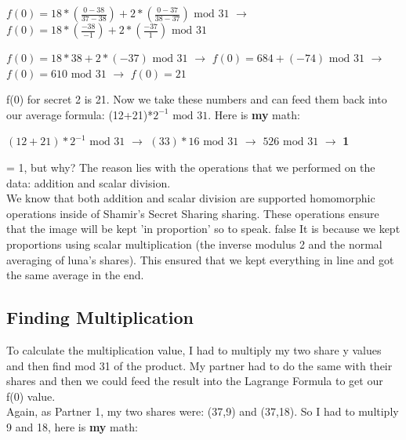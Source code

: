 \documentclass[10pt]{article}
\begin{document}

$f(0) = 18*\left(\frac{0 - 38}{37 - 38}\right) + 2*\left(\frac{0 - 37}{38 - 37}\right) \textrm{ mod } 31$
$\rightarrow$
$f(0) = 18*\left(\frac{-38}{-1}\right) + 2*\left(\frac{-37}{1}\right)  \textrm{ mod } 31$
\vspace{0.1in}

$f(0) = 18*38 + 2*(-37)  \textrm{ mod } 31$
$\rightarrow$
$f(0) = 684 + (-74)  \textrm{ mod } 31$
$\rightarrow$
$f(0) = 610  \textrm{ mod } 31$
$\rightarrow$
$f(0) = 21$
\vspace{0.15in}

\noindent f(0) for secret 2 is 21.  Now we take these numbers and can feed them back into our average formula: (12+21)*$2^{-1} \textrm{ mod } 31$.  Here is \textbf{my} math:\\ \vspace{0.1in}

$\left(12+21\right)*2^{-1} \textrm{ mod } 31$ $\rightarrow$
$\left(33\right)*16 \textrm{ mod } 31$ $\rightarrow$
$526 \textrm{ mod } 31$ $\rightarrow$ \textbf{1}\\
\vspace{0.15in}

 = 1, but why? The reason lies with the operations that we performed on the data: addition and scalar division. \\
We know that both addition and scalar division are supported homomorphic operations inside of Shamir's Secret Sharing sharing. These operations ensure that the image will be kept 'in proportion' so to speak. 
\if false
It is because we kept proportions using scalar multiplication (the inverse modulus 2 and the normal averaging of luna's shares). This ensured that we kept everything in line and got the same average in the end. 
\fi









\vspace{0.2in}
\subsection{Finding Multiplication}
\noindent To calculate the multiplication value, I had to multiply my two share y values and then find mod 31 of the product. My partner had to do the same with their shares and then we could feed the result into the Lagrange Formula to get our f(0) value.\\
Again, as Partner 1, my two shares were: (37,9) and (37,18). 
So I had to multiply 9 and 18, here is \textbf{my} math:\\ \vspace{0.1in}
\end{document}
